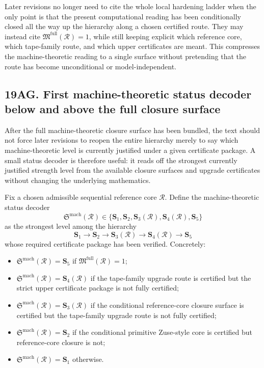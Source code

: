 \begin{corollary}
Later revisions no longer need to cite the whole local hardening ladder when the only point is that the present computational reading has been conditionally closed all the way up the hierarchy along a chosen certified route. They may instead cite \(\mathfrak M^{\mathrm{full}}(\mathcal R)=1\), while still keeping explicit which reference core, which tape-family route, and which upper certificates are meant. This compresses the machine-theoretic reading to a single surface without pretending that the route has become unconditional or model-independent.
\end{corollary}




\subsection*{19AG. First machine-theoretic status decoder below and above the full closure surface}
After the full machine-theoretic closure surface has been bundled, the text should not force later revisions to reopen the entire hierarchy merely to say which machine-theoretic level is currently justified under a given certificate package. A small status decoder is therefore useful: it reads off the strongest currently justified strength level from the available closure surfaces and upgrade certificates without changing the underlying mathematics.

\begin{definition}
Fix a chosen admissible sequential reference core \(\mathcal R\). Define the machine-theoretic status decoder
\[
\mathfrak S^{\mathrm{mach}}(\mathcal R)\in\{\mathbf S_1,\mathbf S_2,\mathbf S_3(\mathcal R),\mathbf S_4(\mathcal R),\mathbf S_5\}
\]
as the strongest level among the hierarchy
\[
\mathbf S_1\longrightarrow \mathbf S_2\longrightarrow \mathbf S_3(\mathcal R)\longrightarrow \mathbf S_4(\mathcal R)\longrightarrow \mathbf S_5
\]
whose required certificate package has been verified. Concretely:
\begin{itemize}[leftmargin=2em]
  \item \(\mathfrak S^{\mathrm{mach}}(\mathcal R)=\mathbf S_5\) if \(\mathfrak M^{\mathrm{full}}(\mathcal R)=1\);
  \item \(\mathfrak S^{\mathrm{mach}}(\mathcal R)=\mathbf S_4(\mathcal R)\) if the tape-family upgrade route is certified but the strict upper certificate package is not fully certified;
  \item \(\mathfrak S^{\mathrm{mach}}(\mathcal R)=\mathbf S_3(\mathcal R)\) if the conditional reference-core closure surface is certified but the tape-family upgrade route is not fully certified;
  \item \(\mathfrak S^{\mathrm{mach}}(\mathcal R)=\mathbf S_2\) if the conditional primitive Zuse-style core is certified but reference-core closure is not;
  \item \(\mathfrak S^{\mathrm{mach}}(\mathcal R)=\mathbf S_1\) otherwise.
\end{itemize}
\end{definition}


